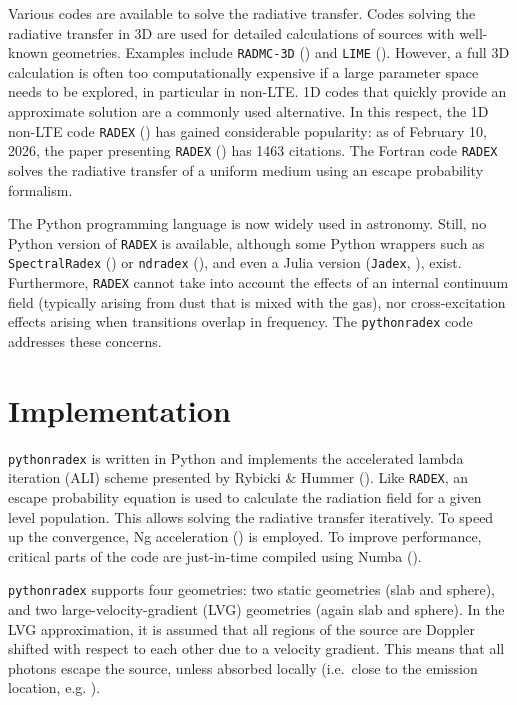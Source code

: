 \documentclass[
]{article}
\begin{document}
Various codes are available to solve the radiative transfer. Codes
solving the radiative transfer in 3D are used for detailed calculations
of sources with well-known geometries. Examples include
\texttt{RADMC-3D} ()
and \texttt{LIME} (). However, a full 3D calculation is often too computationally
expensive if a large parameter space needs to be explored, in particular
in non-LTE. 1D codes that quickly provide an approximate solution are a
commonly used alternative. In this respect, the 1D non-LTE code
\texttt{RADEX} ()
has gained considerable popularity: as of February 10, 2026, the paper
presenting \texttt{RADEX} () has 1463 citations. The Fortran code \texttt{RADEX} solves
the radiative transfer of a uniform medium using an escape probability
formalism.

The Python programming language is now widely used in astronomy. Still,
no Python version of \texttt{RADEX} is available, although some Python
wrappers such as \texttt{SpectralRadex}
() or
\texttt{ndradex} (), and even a
Julia version (\texttt{Jadex}, ),
exist. Furthermore, \texttt{RADEX} cannot take into account the effects
of an internal continuum field (typically arising from dust that is
mixed with the gas), nor cross-excitation effects arising when
transitions overlap in frequency. The \texttt{pythonradex} code
addresses these concerns.

\section{Implementation}\label{implementation}

\texttt{pythonradex} is written in Python and implements the accelerated
lambda iteration (ALI) scheme presented by Rybicki \& Hummer
(). Like \texttt{RADEX}, an escape
probability equation is used to calculate the radiation field for a
given level population. This allows solving the radiative transfer
iteratively. To speed up the convergence, Ng acceleration
() is employed. To improve performance,
critical parts of the code are just-in-time compiled using Numba
().

\texttt{pythonradex} supports four geometries: two static geometries
(slab and sphere), and two large-velocity-gradient (LVG) geometries
(again slab and sphere). In the LVG approximation, it is assumed that
all regions of the source are Doppler shifted with respect to each other
due to a velocity gradient. This means that all photons escape the
source, unless absorbed locally (i.e.~close to the emission location,
e.g. ).
\end{document}
